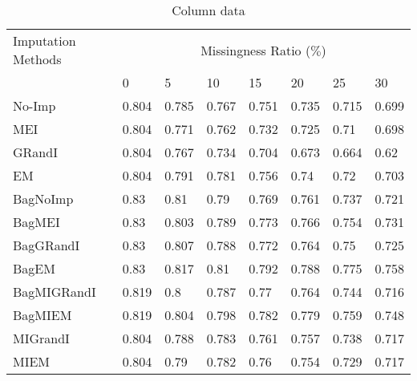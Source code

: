 \documentclass{iosart2c}
\begin{document}
\begin{table*}[htb]
\centering
\caption{Column data}
\label{tab:column}
    \begin{tabular}{|p{25mm}|l|l|l|l|l|l|l|} \hline
     Imputation Methods    & \multicolumn{7}{c|}{Missingness Ratio ($\%$)} \\ \cline{2-8}
                           &  0 & 5 & 10 & 15 & 20 & 25 & 30 \\ \hline
No-Imp & 0.804 & 0.785 & 0.767 & 0.751 & 0.735 & 0.715 & 0.699 \\ \hline
MEI & 0.804 & 0.771 & 0.762 & 0.732 & 0.725 & 0.71 & 0.698 \\ \hline
GRandI & 0.804 & 0.767 & 0.734 & 0.704 & 0.673 & 0.664 & 0.62 \\ \hline
EM & 0.804 & 0.791 & 0.781 & 0.756 & 0.74 & 0.72 & 0.703 \\ \hline \hline
BagNoImp & 0.83 & 0.81 & 0.79 & 0.769 & 0.761 & 0.737 & 0.721 \\ \hline
BagMEI & 0.83 & 0.803 & 0.789 & 0.773 & 0.766 & 0.754 & 0.731 \\ \hline
BagGRandI & 0.83 & 0.807 & 0.788 & 0.772 & 0.764 & 0.75 & 0.725 \\ \hline
BagEM & 0.83 & 0.817 & 0.81 & 0.792 & 0.788 & 0.775 & 0.758 \\ \hline \hline
BagMIGRandI & 0.819 & 0.8 & 0.787 & 0.77 & 0.764 & 0.744 & 0.716 \\ \hline
BagMIEM & 0.819 & 0.804 & 0.798 & 0.782 & 0.779 & 0.759 & 0.748 \\ \hline \hline
MIGrandI & 0.804 & 0.788 & 0.783 & 0.761 & 0.757 & 0.738 & 0.717 \\ \hline
MIEM & 0.804 & 0.79 & 0.782 & 0.76 & 0.754 & 0.729 & 0.717 \\ \hline
\end{tabular}
\end{table*}

\end{document}
